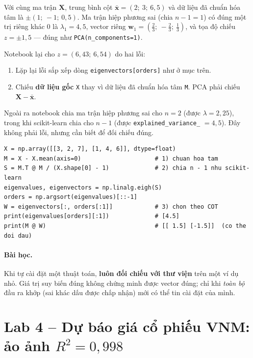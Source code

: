 Với cùng ma trận $\mathbf{X}$, trung bình cột $\bar{\mathbf{x}} = (2;\ 3;\ 6{,}5)$ và dữ liệu đã chuẩn hóa tâm là $\pm(1;\ -1;\ 0{,}5)$. Ma trận hiệp phương sai (chia $n - 1 = 1$) có đúng một trị riêng khác 0 là $\lambda_1 = 4{,}5$, vector riêng $\mathbf{w}_1 = \left(\tfrac{2}{3};\ -\tfrac{2}{3};\ \tfrac{1}{3}\right)$, và tọa độ chiếu $z = \pm 1{,}5$ --- đúng như \texttt{PCA(n\_components=1)}.

Notebook lại cho $z = (6{,}43;\ 6{,}54)$ do hai lỗi:
\begin{enumerate}
    \item Lặp lại lỗi sắp xếp dòng \texttt{eigenvectors[orders]} như ở mục trên.
    \item Chiếu \textbf{dữ liệu gốc} \texttt{X} thay vì dữ liệu đã chuẩn hóa tâm \texttt{M}. PCA phải chiếu $\mathbf{X} - \bar{\mathbf{x}}$.
\end{enumerate}
Ngoài ra notebook chia ma trận hiệp phương sai cho $n = 2$ (được $\lambda = 2{,}25$), trong khi scikit-learn chia cho $n - 1$ (được \texttt{explained\_variance\_} $= 4{,}5$). Đây không phải lỗi, nhưng cần biết để đối chiếu đúng.

\begin{lstlisting}[caption={PCA tự cài đặt -- phiên bản đúng}]
X = np.array([[3, 2, 7], [1, 4, 6]], dtype=float)
M = X - X.mean(axis=0)                     # 1) chuan hoa tam
S = M.T @ M / (X.shape[0] - 1)             # 2) chia n - 1 nhu scikit-learn
eigenvalues, eigenvectors = np.linalg.eigh(S)
orders = np.argsort(eigenvalues)[::-1]
W = eigenvectors[:, orders[:1]]            # 3) chon theo COT
print(eigenvalues[orders][:1])             # [4.5]
print(M @ W)                               # [[ 1.5] [-1.5]]  (co the doi dau)
\end{lstlisting}

\paragraph{Bài học.} Khi tự cài đặt một thuật toán, \textbf{luôn đối chiếu với thư viện} trên một ví dụ nhỏ. Giá trị suy biến đúng không chứng minh được vector đúng; chỉ khi \textit{toàn bộ} đầu ra khớp (sai khác dấu được chấp nhận) mới có thể tin cài đặt của mình.

\section{Lab 4 -- Dự báo giá cổ phiếu VNM: ảo ảnh $R^2 = 0{,}998$}
\label{sec:lab-vnm}


